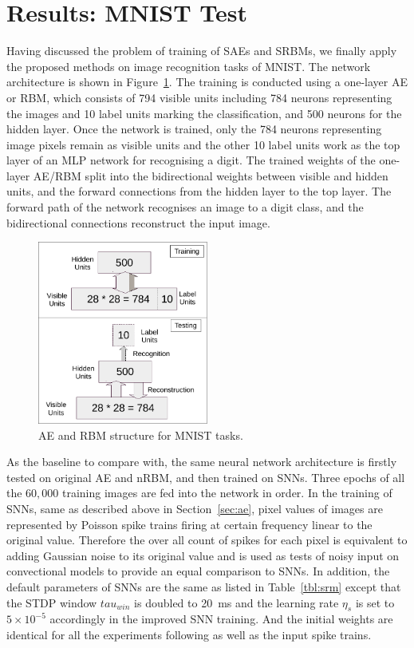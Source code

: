 \section{Results: MNIST Test}
Having discussed the problem of training of SAEs and SRBMs, we finally apply the proposed methods on image recognition tasks of MNIST.
The network architecture is shown in Figure~\ref{fig:MNSIT}.
The training is conducted using a one-layer AE or RBM, which consists of 794 visible units including 784 neurons representing the images and 10 label units marking the classification, and 500 neurons for the hidden layer.
Once the network is trained, only the 784 neurons representing image pixels remain as visible units and the other 10 label units work as the top layer of an MLP network for recognising a digit.
The trained weights of the one-layer AE/RBM split into the bidirectional weights between visible and hidden units, and the forward connections from the hidden layer to the top layer.
The forward path of the network recognises an image to a digit class, and the bidirectional connections reconstruct the input image.

\begin{figure}
	\centering
	\includegraphics[width=0.5\textwidth]{pics_sdlm/mnist.pdf}
	\caption{AE and RBM structure for MNIST tasks.}
	\label{fig:MNSIT}
\end{figure}

As the baseline to compare with, the same neural network architecture is firstly tested on original AE and nRBM, and then trained on SNNs.
Three epochs of all the $60,000$ training images are fed into the network in order.
In the training of SNNs, same as described above in Section~\ref{sec:ae}, pixel values of images are represented by Poisson spike trains firing at certain frequency linear to the original value.
Therefore the over all count of spikes for each pixel is equivalent to adding Gaussian noise to its original value and is used as tests of noisy input on convectional models to provide an equal comparison to SNNs.
In addition, the default parameters of SNNs are the same as listed in Table~\ref{tbl:srm} except that the STDP window $tau_{win}$ is doubled to 20~ms and the learning rate $\eta_s$ is set to $5 \times 10^{-5}$ accordingly in the improved SNN training.
And the initial weights are identical for all the experiments following as well as the input spike trains.

